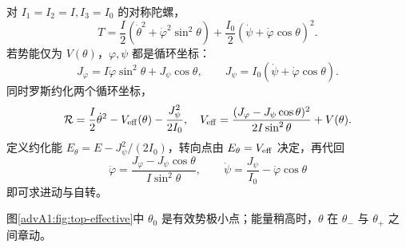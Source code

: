 对 $I_1=I_2=I, I_3=I_0$ 的对称陀螺，
\begin{equation}\label{advA1:eq:symmetric-top-T}
 T=\frac I2(\dot\theta^2+\dot\varphi^2\sin^2\theta)
 +\frac{I_0}{2}(\dot\psi+\dot\varphi\cos\theta)^2.
\end{equation}
若势能仅为 $V(\theta)$，$\varphi,\psi$ 都是循环坐标：
\[
 J_\varphi=I\dot\varphi\sin^2\theta+J_\psi\cos\theta,
 \qquad
 J_\psi=I_0(\dot\psi+\dot\varphi\cos\theta).
\]
同时罗斯约化两个循环坐标，
\begin{equation}\label{advA1:eq:top-effective}
 \mathcal R=\frac I2\dot\theta^2-V_{\rm eff}(\theta)-\frac{J_\psi^2}{2I_0},
 \quad
 V_{\rm eff}=\frac{(J_\varphi-J_\psi\cos\theta)^2}
 {2I\sin^2\theta}+V(\theta).
\end{equation}
定义约化能 $E_\theta=E-J_\psi^2/(2I_0)$，转向点由 $E_\theta=V_{\rm eff}$ 决定，再代回
\[
 \dot\varphi=\frac{J_\varphi-J_\psi\cos\theta}{I\sin^2\theta},
 \qquad
 \dot\psi=\frac{J_\psi}{I_0}-\dot\varphi\cos\theta
\]
即可求进动与自转。
\begin{center}\begin{minipage}{\linewidth}\centering
{}
\label{advA1:fig:top-effective}
\end{minipage}\end{center}
图\ref{advA1:fig:top-effective}中 $\theta_0$ 是有效势极小点；能量稍高时，$\theta$ 在 $\theta_-$ 与 $\theta_+$ 之间章动。

